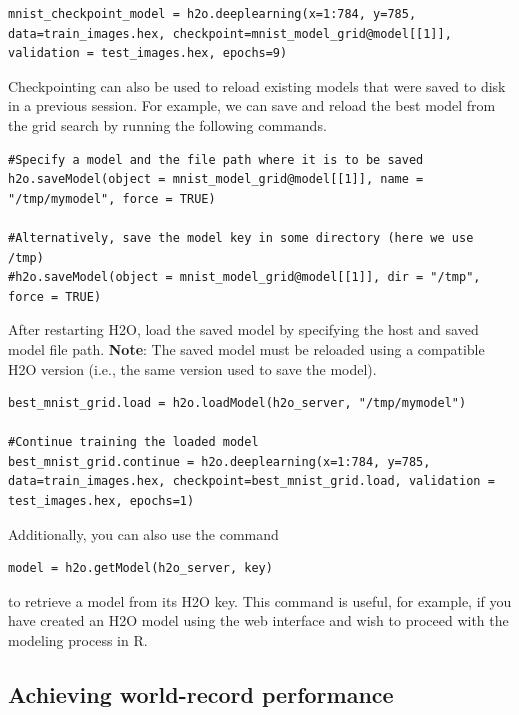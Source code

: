 \begin{lstlisting}[style=R]
mnist_checkpoint_model = h2o.deeplearning(x=1:784, y=785, data=train_images.hex, checkpoint=mnist_model_grid@model[[1]], validation = test_images.hex, epochs=9)

\end{lstlisting}
\noindent
Checkpointing can also be used to reload existing models that were saved to disk in a previous session. For example, we can save and reload the best model from the grid search by running the following commands.

\begin{lstlisting}[style=R]
#Specify a model and the file path where it is to be saved
h2o.saveModel(object = mnist_model_grid@model[[1]], name = "/tmp/mymodel", force = TRUE)

#Alternatively, save the model key in some directory (here we use /tmp)
#h2o.saveModel(object = mnist_model_grid@model[[1]], dir = "/tmp", force = TRUE)

\end{lstlisting}
\normalsize

\noindent
After restarting  H2O, load the saved model by specifying the host and saved model file path. \textbf{Note}: The saved model must be reloaded using a compatible H2O version (i.e., the same version used to save the model).

\begin{lstlisting}[style=R]
best_mnist_grid.load = h2o.loadModel(h2o_server, "/tmp/mymodel")

#Continue training the loaded model
best_mnist_grid.continue = h2o.deeplearning(x=1:784, y=785, data=train_images.hex, checkpoint=best_mnist_grid.load, validation = test_images.hex, epochs=1)

\end{lstlisting}
\normalsize

\noindent
Additionally, you can also use the command
\begin{lstlisting}[style=R]
model = h2o.getModel(h2o_server, key)

\end{lstlisting}
\noindent
to retrieve a model from its H2O key. This command is useful, for example, if you have created an H2O model using the web interface and wish to proceed with the modeling process in R.

\subsection{Achieving world-record performance}

